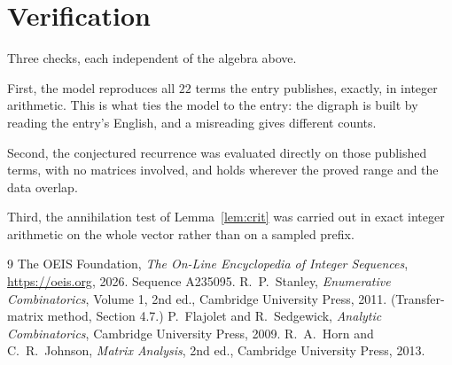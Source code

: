 \documentclass[11pt,a4paper]{article}
\theoremstyle{plain}
\theoremstyle{definition}
\begin{document}
\section{Verification}

Three checks, each independent of the algebra above.

First, the model reproduces all $22$ terms the entry publishes, exactly, in integer
arithmetic. This is what ties the model to the entry: the digraph is built by reading the
entry's English, and a misreading gives different counts.

Second, the conjectured recurrence was evaluated directly on those published terms, with no
matrices involved, and holds wherever the proved range and the data overlap.

Third, the annihilation test of Lemma~\ref{lem:crit} was carried out in exact integer
arithmetic on the whole vector rather than on a sampled prefix.

\begin{thebibliography}{9}
 The OEIS Foundation, \emph{The On-Line Encyclopedia of Integer
Sequences}, \url{https://oeis.org}, 2026. Sequence A235095.
 R.~P.~Stanley, \emph{Enumerative Combinatorics}, Volume 1, 2nd ed.,
Cambridge University Press, 2011. (Transfer-matrix method, Section 4.7.)
 P.~Flajolet and R.~Sedgewick, \emph{Analytic Combinatorics}, Cambridge
University Press, 2009.
 R.~A.~Horn and C.~R.~Johnson, \emph{Matrix Analysis}, 2nd ed., Cambridge
University Press, 2013.
\end{thebibliography}
\end{document}
